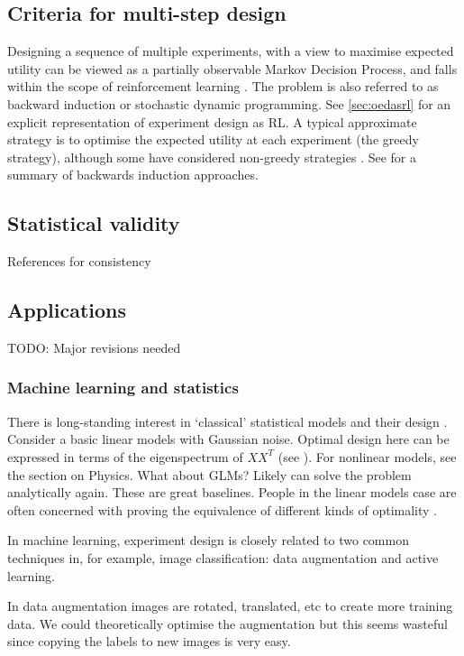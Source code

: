 \subsection{Criteria for multi-step design}
Designing a sequence of multiple experiments, with a view to maximise expected utility can be viewed as a partially observable Markov Decision Process, and falls within the scope of reinforcement learning \cite{pang2018}. The problem is also referred to as backward induction or stochastic dynamic programming. See \ref{sec:oedasrl} for an explicit representation of experiment design as RL. A typical approximate strategy is to optimise the expected utility at each experiment (the greedy strategy), although some have considered non-greedy strategies \cite{gonzalez2016} \cite{pang2018}. See \cite[sec 6.1]{ryan2015} for a summary of backwards induction approaches.





\subsection{Statistical validity}
References for consistency


\subsection{Applications}
TODO: Major revisions needed

\subsubsection{Machine learning and statistics}
There is long-standing interest in `classical' statistical models and their design \cite{youssefreview}. Consider a basic linear models with Gaussian noise. Optimal design here can be expressed in terms of the eigenspectrum of $XX^T$ (see \cite{chaloner1984}). For nonlinear models, see the section on Physics. What about GLMs? Likely can solve the problem analytically again. These are great baselines. People in the linear models case are often concerned with proving the equivalence of different kinds of optimality \cite{youssefreview}.

In machine learning, experiment design is closely related to two common techniques in, for example, image classification: data augmentation and active learning.

In data augmentation images are rotated, translated, etc to create more training data. We could theoretically optimise the augmentation but this seems wasteful since copying the labels to new images is very easy.

